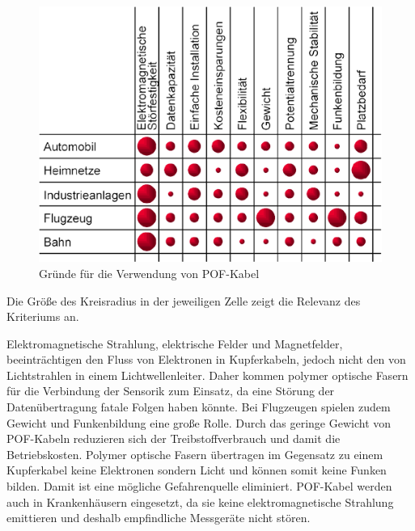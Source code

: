 \begin{figure}[h]
    \begin{center}
        \begin{minipage}[t]{\textwidth}
            \begin{center}
                \includegraphics[height=0.2\textheight]{Bilder/Optische_Wellenleiter_Die_Polymer_Optische_Faser/Allgemeines/pofgrund.png}
                \caption[Gründe für die Verwendung von POF-Kabel \newline \url{http://www.pofac.fh-nuernberg.de/pofac/de/was_sind_pof/images/warum_pof.png} (zuletzt aufgerufen am 19.09.2015)]{Gründe für die Verwendung von POF-Kabel}
                \label{fig:pofgrund}
            \end{center}
        \end{minipage}
    \end{center}
\end{figure}

Die Größe des Kreisradius in der jeweiligen Zelle zeigt die Relevanz des
Kriteriums an.

Elektromagnetische Strahlung, elektrische Felder und Magnetfelder,
beeinträchtigen den Fluss von Elektronen in Kupferkabeln, jedoch nicht den von
Lichtstrahlen in einem Lichtwellenleiter. Daher kommen polymer optische Fasern
für die Verbindung der Sensorik zum Einsatz, da eine Störung der
Datenübertragung fatale Folgen haben könnte. Bei Flugzeugen spielen zudem
Gewicht und Funkenbildung eine große Rolle. Durch das geringe Gewicht von
POF-Kabeln reduzieren sich der Treibstoffverbrauch und damit die Betriebskosten.
Polymer optische Fasern übertragen im Gegensatz zu einem Kupferkabel keine
Elektronen sondern Licht und können somit keine Funken bilden. Damit ist eine
mögliche Gefahrenquelle eliminiert. POF-Kabel werden auch in Krankenhäusern
eingesetzt, da sie keine elektromagnetische Strahlung emittieren und deshalb
empfindliche Messgeräte nicht stören.
